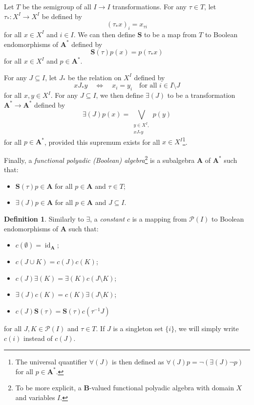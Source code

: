 \documentclass{article}
\theoremstyle{definition}
\newtheorem{definition}{Definition}
\theoremstyle{remark}
\DeclareMathOperator{\id}{id}
\begin{document}
Let $T$ be the semigroup of all $I \to I$ transformations. For any $\tau \in
T$, let $\tau_* : X^I \to X^I$ be defined by
\[
  (\tau_* x)_i = x_{\tau i}
\]
for all $x \in X^I$ and $i \in I$. We can then define $\mathbf{S}$ to be a map
from $T$ to Boolean endomorphisms of $\mathbf{A^*}$ defined by
\[
  \mathbf{S}(\tau)p(x) = p(\tau_* x)
\]
for all $x \in X^I$ and $p \in \mathbf{A^*}$.

For any $J \subseteq I$, let $J_*$ be the relation on $X^I$ defined by
\[
  xJ_*y \quad \iff \quad x_i = y_i \quad \text{for all } i \in I \setminus J
\]
for all $x, y \in X^I$. For any $J \subseteq I$, we then define $\bm\exists(J)$
to be a transformation $\mathbf{A^*} \to \mathbf{A^*}$ defined by
\[
  \bm\exists(J)p(x) = \bigvee_{\substack{y \in X^I,\\ xJ_*y}} p(y)
\]
for all $p \in \mathbf{A^*}$, provided this supremum exists for all $x \in
X^I$\footnote{The universal quantifier $\bm\forall(J)$ is then defined as
  $\bm\forall(J)p = \neg(\bm\exists(J)\neg p)$ for all $p \in \mathbf{A^*}$.}.

Finally, a \emph{functional polyadic (Boolean) algebra}\footnote{To be more
  explicit, a $\mathbf{B}$-valued functional polyadic algebra with domain $X$
  and variables $I$.} is a subalgebra
$\mathbf{A}$ of $\mathbf{A^*}$ such that:
\begin{itemize}
\item $\mathbf{S}(\tau)p \in \mathbf{A}$ for all $p \in \mathbf{A}$ and $\tau
  \in T$;
\item $\bm\exists(J)p \in \mathbf{A}$ for all $p \in \mathbf{A}$ and $J
  \subseteq I$.
\end{itemize}

\begin{definition}
  Similarly to $\bm\exists$, a \emph{constant} $c$ is a mapping from
  $\mathcal{P}(I)$ to Boolean endomorphisms of $\mathbf{A}$ such that:
  \begin{itemize}
  \item $c(\emptyset) = \id_{\mathbf{A}}$;
  \item $c(J \cup K) = c(J)c(K)$;
  \item $c(J)\bm\exists(K) = \bm\exists(K)c(J \setminus K)$;
  \item $\bm\exists(J)c(K) = c(K)\bm\exists(J \setminus K)$;
  \item $c(J)\mathbf{S}(\tau) = \mathbf{S}(\tau)c(\tau^{-1}J)$
  \end{itemize}
  for all $J, K \in \mathcal{P}(I)$ and $\tau \in T$. If $J$ is a singleton
  set $\{ i \}$, we will simply write $c(i)$ instead of $c(J)$.
\end{definition}
\end{document}
